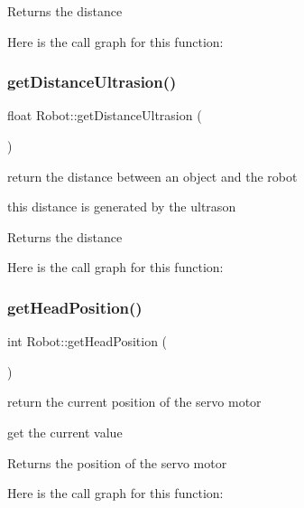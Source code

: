 \begin{DoxyReturn}{Returns}
the distance 
\end{DoxyReturn}
Here is the call graph for this function\+:
\mbox{\label{class_robot_ae3e977cb38b69c31faafd993a2b4054d}} 
\subsubsection{\texorpdfstring{get\+Distance\+Ultrasion()}{getDistanceUltrasion()}}
{\footnotesize\ttfamily float Robot\+::get\+Distance\+Ultrasion (\begin{DoxyParamCaption}{ }\end{DoxyParamCaption})}



return the distance between an object and the robot 

this distance is generated by the ultrason

\begin{DoxyReturn}{Returns}
the distance 
\end{DoxyReturn}
Here is the call graph for this function\+:
\mbox{\label{class_robot_a34039e49403d45d263e834f11d9c85e9}} 
\subsubsection{\texorpdfstring{get\+Head\+Position()}{getHeadPosition()}}
{\footnotesize\ttfamily int Robot\+::get\+Head\+Position (\begin{DoxyParamCaption}{ }\end{DoxyParamCaption})}



return the current position of the servo motor 

get the current value

\begin{DoxyReturn}{Returns}
the position of the servo motor 
\end{DoxyReturn}
Here is the call graph for this function\+:
\mbox{\label{class_robot_a69dad285c5a86e600b2ad94e7d30cf8b}} 
